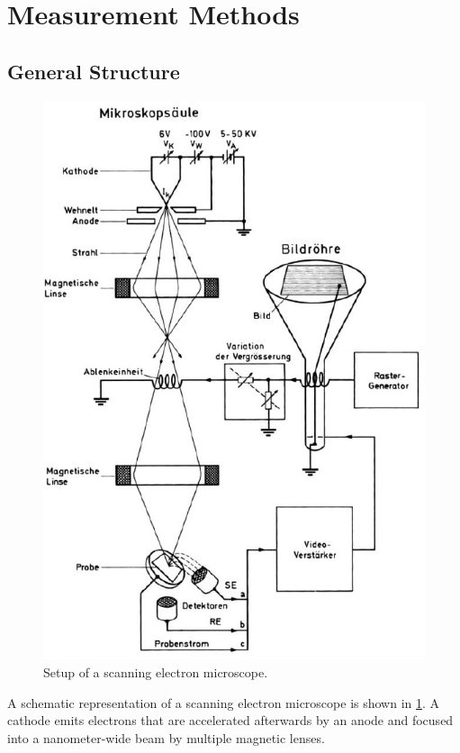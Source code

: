 \section{Measurement Methods}

\subsection{General Structure}
\begin{figure}
	\centering
	\includegraphics[width=0.95\linewidth]{../assets/aufbau.png}
	\caption{Setup of a scanning electron microscope. }
	\label{fig:general_structure}
\end{figure}
A schematic	representation of a scanning electron microscope is shown in
\cref{fig:general_structure}.
A cathode emits electrons that are accelerated afterwards by an anode
and focused into a nanometer-wide beam by multiple magnetic lenses.

